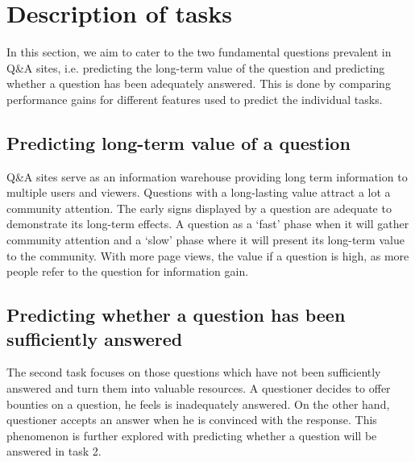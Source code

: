 \section{Description of tasks}
In this section, we aim to cater to the two fundamental questions prevalent in Q\&A sites, i.e. predicting the long-term value of the question and predicting whether a question has been adequately answered. This is done by comparing performance gains for different features used to predict the individual tasks.
\subsection{Predicting long-term value of a question}
Q\&A sites serve as an information warehouse providing long term information to multiple users and viewers. Questions with a long-lasting value attract a lot a community attention. The early signs displayed by a question are adequate to demonstrate its long-term effects. A question as a ‘fast’ phase when it will gather community attention and a ‘slow’ phase where it will present its long-term value to the community. With more page views, the value if a question is high, as more people refer to the question for information gain.
\subsection{Predicting whether a question has been sufficiently answered}
The second task focuses on those questions which have not been sufficiently answered and turn them into valuable resources. A questioner decides to offer bounties on a question, he feels is inadequately answered. On the other hand, questioner accepts an answer when he is convinced with the response. This phenomenon is further explored with predicting whether a question will be answered in task 2.
